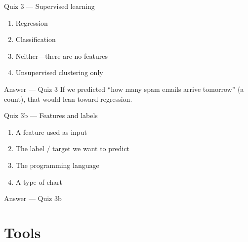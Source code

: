 \documentclass[aspectratio=169,11pt]{beamer}
\begin{document}
    \begin{frame}{Quiz 3 --- Supervised learning}
        \begin{enumerate}
            \item Regression
            \item Classification
            \item Neither---there are no features
            \item Unsupervised clustering only
        \end{enumerate}
        \quizpause
    \end{frame}

    \begin{frame}{Answer --- Quiz 3}
        \vspace{0.4em}
        If we predicted ``how many spam emails arrive tomorrow'' (a count), that would lean toward regression.
    \end{frame}

    \begin{frame}{Quiz 3b --- Features and labels}
        \begin{enumerate}
            \item A feature used as input
            \item The label / target we want to predict
            \item The programming language
            \item A type of chart
        \end{enumerate}
        \quizpause
    \end{frame}

    \begin{frame}{Answer --- Quiz 3b}
    \end{frame}

    \section{Tools}
\end{document}
